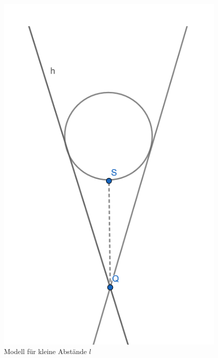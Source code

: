\documentclass[german,  %
parskip=full,  %
]{scrartcl}
\begin{document}
\begin{figure}[h!]\centering
\includegraphics[scale=0.37]{abstand1}
\caption{Modell für kleine Abstände $l$}
\end{figure}
\end{document}
